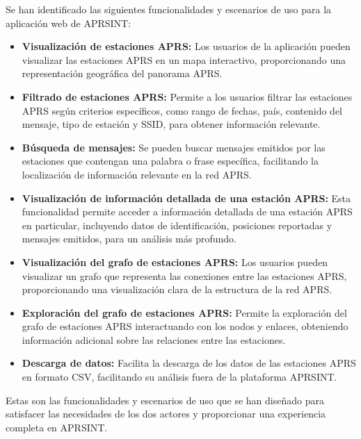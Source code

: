 \noindent Se han identificado las siguientes funcionalidades y escenarios de uso para la aplicación web de APRSINT:
\begin{itemize}
	\item \textbf{Visualización de estaciones APRS:} Los usuarios de la aplicación pueden visualizar las estaciones APRS en un mapa interactivo, proporcionando una representación geográfica del panorama APRS.
	\item \textbf{Filtrado de estaciones APRS:} Permite a los usuarios filtrar las estaciones APRS según criterios específicos, como rango de fechas, país, contenido del mensaje, tipo de estación y SSID, para obtener información relevante.

	\item \textbf{Búsqueda de mensajes:} Se pueden buscar mensajes emitidos por las estaciones que contengan una palabra o frase específica, facilitando la localización de información relevante en la red APRS.

	\item \textbf{Visualización de información detallada de una estación APRS:} Esta funcionalidad permite acceder a información detallada de una estación APRS en particular, incluyendo datos de identificación, posiciones reportadas y mensajes emitidos, para un análisis más profundo.

	\item \textbf{Visualización del grafo de estaciones APRS:} Los usuarios pueden visualizar un grafo que representa las conexiones entre las estaciones APRS, proporcionando una visualización clara de la estructura de la red APRS.

	\item \textbf{Exploración del grafo de estaciones APRS:} Permite la exploración del grafo de estaciones APRS interactuando con los nodos y enlaces, obteniendo información adicional sobre las relaciones entre las estaciones.

	\item \textbf{Descarga de datos:} Facilita la descarga de los datos de las estaciones APRS en formato CSV, facilitando su análisis fuera de la plataforma APRSINT.

\end{itemize}

\noindent Estas son las funcionalidades y escenarios de uso que se han diseñado para satisfacer las necesidades de los dos actores y proporcionar una experiencia completa en APRSINT.